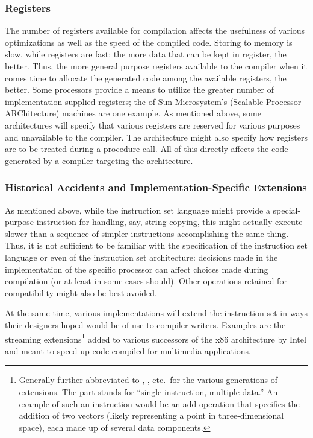 \subsubsection{Registers}
The number of registers available for compilation affects the usefulness of various optimizations as well as the speed of the compiled code. Storing to memory is slow, while registers are fast: the more data that can be kept in register, the better. Thus, the more general purpose registers available to the compiler when it comes time to allocate the generated code among the available registers, the better. Some processors provide a means to utilize the greater number of implementation-supplied registers; the  of Sun Microsystem's  (Scalable Processor ARChitecture) machines are one example. As mentioned above, some architectures will specify that various registers are reserved for various purposes and unavailable to the compiler. The architecture might also specify how registers are to be treated during a procedure call. All of this directly affects the code generated by a compiler targeting the architecture.

\subsubsection{Historical Accidents and Implementation-Specific Extensions}
As mentioned above, while the instruction set language might provide a special-purpose instruction for handling, say, string copying, this might actually execute slower than a sequence of simpler instructions accomplishing the same thing. Thus, it is not sufficient to be familiar with the specification of the instruction set language or even of the instruction set architecture: decisions made in the implementation of the specific processor can affect choices made during compilation (or at least in some cases should). Other operations retained for compatibility might also be best avoided.

At the same time, various implementations will extend the instruction set in ways their designers hoped would be of use to compiler writers. Examples are the streaming  extensions\footnote{Generally further abbreviated to , , etc.\ for the various generations of extensions. The  part stands for ``single instruction, multiple data.'' An example of such an instruction would be an add operation that specifies the addition of two vectors (likely representing a point in three-dimensional space), each made up of several data components.} added to various successors of the x86 architecture by Intel and  meant to speed up code compiled for multimedia applications.

